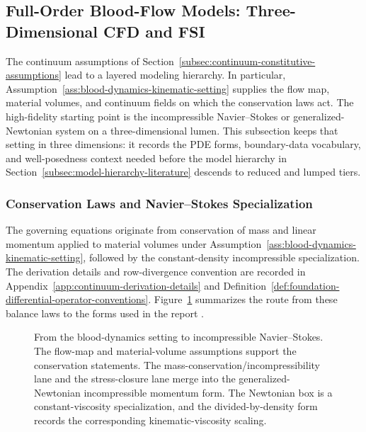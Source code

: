 \subsection{Full-Order Blood-Flow Models: Three-Dimensional CFD and FSI}
\label{subsec:governing-equations-model-hierarchy}

The continuum assumptions of
Section~\ref{subsec:continuum-constitutive-assumptions} lead to a layered
modeling hierarchy. In particular,
Assumption~\ref{ass:blood-dynamics-kinematic-setting} supplies the flow map,
material volumes, and continuum fields on which the conservation laws act. The
high-fidelity starting point is the incompressible Navier--Stokes or
generalized-Newtonian system on a three-dimensional lumen. This subsection keeps
that setting in three dimensions: it records the PDE forms, boundary-data
vocabulary, and well-posedness context needed before the model hierarchy in
Section~\ref{subsec:model-hierarchy-literature} descends to reduced and
lumped tiers.

\subsubsection{Conservation Laws and Navier--Stokes Specialization}
\label{subsubsec:conservation-laws}

The governing equations originate from conservation of mass and linear momentum
applied to material volumes under
Assumption~\ref{ass:blood-dynamics-kinematic-setting}, followed by the
constant-density incompressible specialization. The derivation details and
row-divergence convention are recorded in
Appendix~\ref{app:continuum-derivation-details} and
Definition~\ref{def:foundation-differential-operator-conventions}.
Figure~\ref{fig:ns-derivation-map} summarizes the route from these balance laws
to the forms used in the report
\cite[Part~I, Ch.~1, Secs.~2.2--3.1, pp.~11--19; Part~IV, Ch.~1,
Sec.~1.1, pp.~380--383]{GaldiEtAl2008HemodynamicalFlows}
\cite[Sec.~6]{QuarteroniFormaggia2004CardiovascularModeling}.

\begin{figure}[!htb]
    \centering
    \captionsetup{aboveskip=2pt,belowskip=2pt}
    \caption{From the blood-dynamics setting to incompressible
    Navier--Stokes. The flow-map and material-volume assumptions support the
    conservation statements. The mass-conservation/incompressibility lane and
    the stress-closure lane merge into the generalized-Newtonian
    incompressible momentum form. The Newtonian box is a constant-viscosity
    specialization, and the divided-by-density form records the corresponding
    kinematic-viscosity scaling.}
    \label{fig:ns-derivation-map}
\end{figure}

